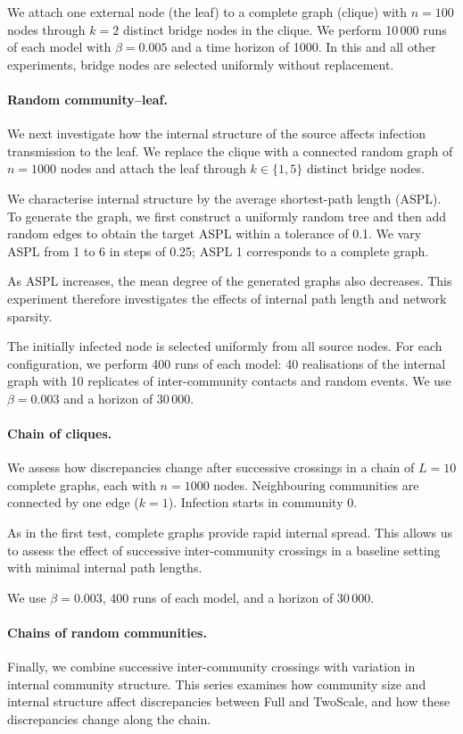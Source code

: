 \documentclass{ieeeaccess}
\newcommand{\Full}{\textup{Full}}
\newcommand{\TS}{\textup{TwoScale}}
\begin{document}
We attach one external node (the leaf) to a complete graph (clique) with $n=100$ nodes through $k=2$ distinct bridge nodes in the clique. We perform 10\,000 runs of each model with $\beta=0.005$ and a time horizon of 1000. In this and all other experiments, bridge nodes are selected uniformly without replacement.

\paragraph{Random community--leaf.}
We next investigate how the internal structure of the source affects infection transmission to the leaf. We replace the clique with a connected random graph of $n=1000$ nodes and attach the leaf through $k\in\{1,5\}$ distinct bridge nodes.

We characterise internal structure by the average shortest-path length (ASPL). To generate the graph, we first construct a uniformly random tree and then add random edges to obtain the target ASPL within a tolerance of 0.1. We vary ASPL from 1 to 6 in steps of 0.25; ASPL 1 corresponds to a complete graph.

As ASPL increases, the mean degree of the generated graphs also decreases. This experiment therefore investigates the effects of internal path length and network sparsity.

The initially infected node is selected uniformly from all source nodes. For each configuration, we perform 400 runs of each model: 40 realisations of the internal graph with 10 replicates of inter-community contacts and random events. We use $\beta=0.003$ and a horizon of 30\,000.

\paragraph{Chain of cliques.}
We assess how discrepancies change after successive crossings in a chain of $L=10$ complete graphs, each with $n=1000$ nodes. Neighbouring communities are connected by one edge ($k=1$). Infection starts in community 0.

As in the first test, complete graphs provide rapid internal spread. This allows us to assess the effect of successive inter-community crossings in a baseline setting with minimal internal path lengths.

We use $\beta=0.003$, 400 runs of each model, and a horizon of 30\,000.

\paragraph{Chains of random communities.}
Finally, we combine successive inter-community crossings with variation in internal community structure. This series examines how community size and internal structure affect discrepancies between \Full{} and \TS{}, and how these discrepancies change along the chain.
\end{document}
